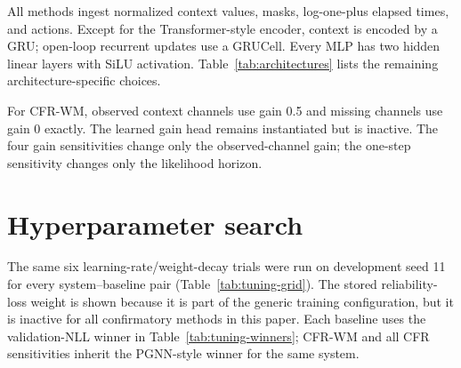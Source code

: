 All methods ingest normalized context values, masks, log-one-plus elapsed times,
and actions. Except for the Transformer-style encoder, context is encoded by a
GRU; open-loop recurrent updates use a GRUCell. Every MLP has two hidden linear
layers with SiLU activation. Table~\ref{tab:architectures} lists the remaining
architecture-specific choices.

\begin{table}[ht]
\centering
\scriptsize
\caption{Exact compact transition architectures used in the confirmatory grid.
The bounded correction is $0.25\tanh(\cdot)$ and all forecast covariances are
diagonal.}
\label{tab:architectures}
\end{table}

For CFR-WM, observed context channels use gain 0.5 and missing channels use
gain 0 exactly. The learned gain head remains instantiated but is inactive.
The four gain sensitivities change only the observed-channel gain; the
one-step sensitivity changes only the likelihood horizon.

\section{Hyperparameter search}

The same six learning-rate/weight-decay trials were run on development seed 11
for every system--baseline pair (Table~\ref{tab:tuning-grid}). The stored
reliability-loss weight is shown because it is part of the generic training
configuration, but it is inactive for all confirmatory methods in this paper.
Each baseline uses the validation-NLL winner in
Table~\ref{tab:tuning-winners}; CFR-WM and all CFR sensitivities inherit the
PGNN-style winner for the same system.

